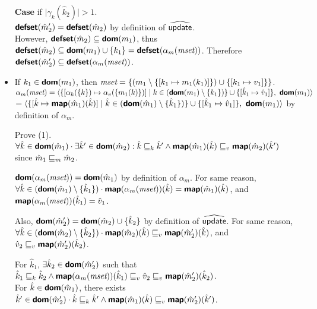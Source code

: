 \begin{itemize}
\textbf{Case} if $\mid \gamma_k(\hat{k}_2) \mid > 1$.\\
$\textsf{\textbf{defset}}(\hat{m}_2') = \textsf{\textbf{defset}}(\hat{m}_2)$ by definition of $\widehat{\textsf{update}}$.\\
However, $\textsf{\textbf{defset}}(\hat{m}_2) \subseteq \textsf{\textbf{dom}}(m_1)$,
thus $\textsf{\textbf{defset}}(\hat{m}_2) \subseteq \textsf{\textbf{dom}}(m_1) \cup \{ k_1 \}
= \textsf{\textbf{defset}}(\alpha_m(\emph{mset}))$.
Therefore $\textsf{\textbf{defset}}(\hat{m}_2') \subseteq \textsf{\textbf{defset}}(\alpha_m(\emph{mset}))$.

\item If $k_1 \in \textsf{\textbf{dom}}(m_1)$, 
then $\emph{mset} = \{ (m_1 \setminus \{ [ k_1 \mapsto m_1(k_1)] \}) \cup \{ [k_1 \mapsto v_1]\} \}$.\\
$\alpha_m(\emph{mset}) = 
\langle \{ [\alpha_k(\{ k \}) \mapsto \alpha_v(\{ m_1(k) \} )] \mid 
k \in (\textsf{\textbf{dom}}(m_1) \setminus \{ k_1 \})\}
\cup \{ [ \hat{k}_1 \mapsto \hat{v}_1 ] \},\ \textsf{\textbf{dom}}(m_1) \rangle$\\
$= \langle \{ [ \hat{k} \mapsto \textsf{\textbf{map}}(\hat{m}_1)(\hat{k}) ] \mid 
\hat{k} \in (\textsf{\textbf{dom}}(\hat{m}_1) \setminus \{ \hat{k}_1 \}) \}
\cup \{ [ \hat{k}_1 \mapsto \hat{v}_1 ] \},\ \textsf{\textbf{dom}}(m_1) \rangle$
by definition of $\alpha_m$.

Prove (1). \\
$\forall \hat{k} \in \textsf{\textbf{dom}}(\hat{m}_1) \cdot \exists \hat{k}' \in \textsf{\textbf{dom}}(\hat{m}_2):
\hat{k} \sqsubseteq_k \hat{k}' \land \textsf{\textbf{map}}(\hat{m}_1)(\hat{k}) \sqsubseteq_v \textsf{\textbf{map}}(\hat{m}_2)(\hat{k}')$
since $\hat{m}_1 \sqsubseteq_m \hat{m}_2$.

$\textsf{\textbf{dom}}(\alpha_m(\emph{mset})) = \textsf{\textbf{dom}}(\hat{m}_1)$ 
by definition of $\alpha_m$. For same reason, \\
$\forall \hat{k} \in (\textsf{\textbf{dom}}(\hat{m}_1) \setminus \{ \hat{k}_1 \}) \cdot
\textsf{\textbf{map}}(\alpha_m(\emph{mset}))(\hat{k}) = \textsf{\textbf{map}}(\hat{m}_1)(\hat{k})$,
and $\textsf{\textbf{map}}(\alpha_m(\emph{mset}))(\hat{k}_1) = \hat{v}_1$.

Also, $\textsf{\textbf{dom}}(\hat{m}_2') = \textsf{\textbf{dom}}(\hat{m}_2) \cup \{ \hat{k}_2 \}$
by definition of $\widehat{\textsf{update}}$. For same reason, \\
$\forall \hat{k} \in (\textsf{\textbf{dom}}(\hat{m}_2) \setminus \{ \hat{k}_2 \}) \cdot
\textsf{\textbf{map}}(\hat{m}_2)(\hat{k}) \sqsubseteq_v \textsf{\textbf{map}}(\hat{m}_2')(\hat{k})$,
and $\hat{v}_2 \sqsubseteq_v \textsf{\textbf{map}}(\hat{m}_2')(\hat{k}_2)$.

For $\hat{k}_1$, $\exists \hat{k}_2 \in \textsf{\textbf{dom}}(\hat{m}_2')$
such that $\hat{k}_1 \sqsubseteq_k \hat{k}_2 \land 
\textsf{\textbf{map}}(\alpha_m(\emph{mset}))(\hat{k}_1) \sqsubseteq_v \hat{v}_2 \sqsubseteq_v \textsf{\textbf{map}}(\hat{m}_2')(\hat{k}_2)$.\\
For $\hat{k} \in \textsf{\textbf{dom}}(\hat{m}_1)$,
there exists $\hat{k}' \in \textsf{\textbf{dom}}(\hat{m}_2') \cdot 
\hat{k} \sqsubseteq_k \hat{k}' \land \textsf{\textbf{map}}(\hat{m}_1)(\hat{k}) \sqsubseteq_v \textsf{\textbf{map}}(\hat{m}_2')(\hat{k}')$.


\end{itemize}
